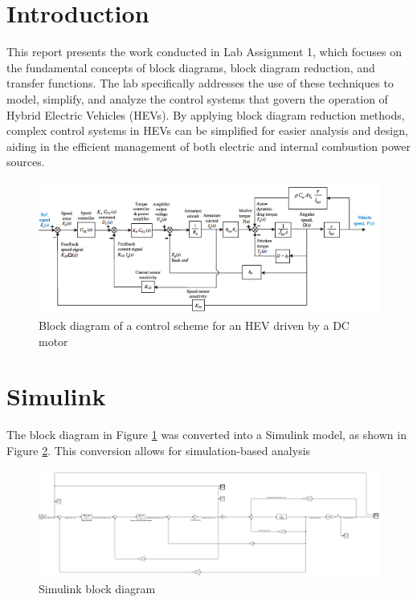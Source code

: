 \documentclass[a4paper, 12pt, english]{article}
\begin{document}

  \newpage
  \hypersetup{linkcolor=black}
  \tableofcontents

\newpage
\section{Introduction}
This report presents the work conducted in Lab Assignment 1, which focuses on the fundamental concepts of block diagrams, block diagram reduction, and transfer functions. The lab specifically addresses the use of these techniques to model, simplify, and analyze the control systems that govern the operation of Hybrid Electric Vehicles (HEVs). By applying block diagram reduction methods, complex control systems in HEVs can be simplified for easier analysis and design, aiding in the efficient management of both electric and internal combustion power sources.
\begin{figure}[H]
    \centering
    \includegraphics[width=\linewidth]{images/hev.png}
    \caption{Block diagram of a control scheme for an HEV driven by a DC motor}
    \label{fig:Block diagram of a control scheme for an HEV driven by a DC motor}
\end{figure}
\section{Simulink}
The block diagram in Figure \ref{fig:Block diagram of a control scheme for an HEV driven by a DC motor} was converted into a Simulink model, as shown in Figure \ref{fig:Simulink block diagram}. This conversion allows for simulation-based analysis
\begin{figure}[H]
    \centering
    \includegraphics[width=\linewidth]{images/simulink.png}
    \caption{Simulink block diagram}
    \label{fig:Simulink block diagram}
\end{figure}
\end{document}
